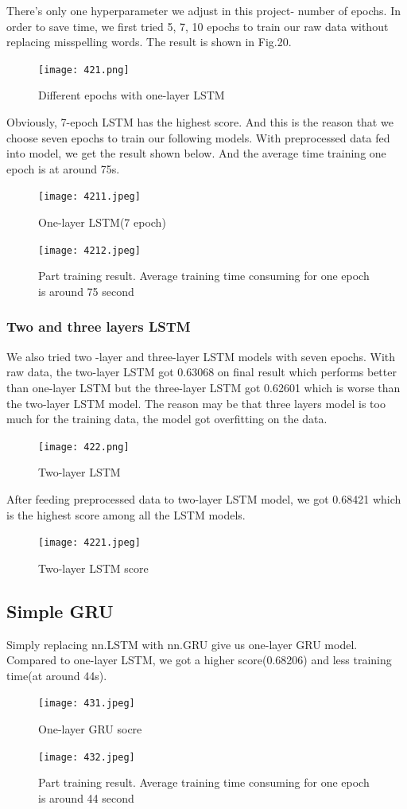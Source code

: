 \documentclass{article}
\begin{document}
\noindent There’s only one hyperparameter we adjust in this project- number of epochs. In order to save time, we first tried 5, 7, 10 epochs to train our raw data without replacing misspelling words. The result is shown in Fig.20.\\
\begin{figure}[H]
	\centering
	\texttt{[image: 421.png]}
	\caption{Different epochs with one-layer LSTM}
\end{figure}
\noindent Obviously, 7-epoch LSTM has the highest score. And this is the reason that we choose seven epochs to train our following models.
With preprocessed data fed into model, we get the result shown below. And the average time training one epoch is at around 75s.
\begin{figure}[H]
	\centering
	\texttt{[image: 4211.jpeg]}
	\caption{One-layer LSTM(7 epoch)
	}
\end{figure}
\begin{figure}[H]
	\centering
	\texttt{[image: 4212.jpeg]}
	\caption{Part training result. Average training time consuming for one epoch is around 75 second
	}
\end{figure}
\subsubsection{ Two and three layers LSTM}
\noindent We also tried two -layer and three-layer LSTM models with seven epochs. With raw data, the two-layer LSTM got 0.63068 on final result which performs better than one-layer LSTM but the three-layer LSTM got 0.62601 which is worse than the two-layer LSTM model. The reason may be that three layers model is too much for the training data, the model got overfitting on the data.\\
\begin{figure}[H]
	\centering
	\texttt{[image: 422.png]}
	\caption{Two-layer LSTM}
\end{figure}
\noindent After feeding preprocessed data to two-layer LSTM model, we got 0.68421 which is the highest score among all the LSTM models.\\
	\begin{figure}[H]
		\centering
		\texttt{[image: 4221.jpeg]}
		\caption{ Two-layer LSTM score }
	\end{figure}
\subsection{Simple GRU}
\noindent Simply replacing nn.LSTM with nn.GRU give us one-layer GRU model. Compared to one-layer LSTM, we got a higher score(0.68206) and less training time(at around 44s).\\
	\begin{figure}[H]
	\centering
	\texttt{[image: 431.jpeg]}
	\caption{ One-layer GRU socre}
\end{figure}
\begin{figure}[H]
	\centering
	\texttt{[image: 432.jpeg]}
	\caption{Part training result. Average training time consuming for one epoch is around 44 second}
\end{figure}
\end{document}
